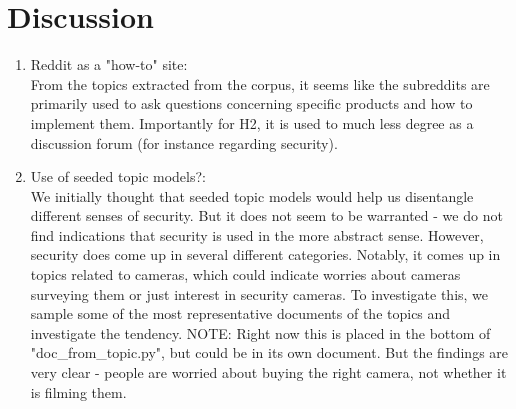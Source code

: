 \documentclass{article}
\begin{document}
    \section{Discussion}
    \begin{enumerate}
        \item Reddit as a "how-to" site:\\
        From the topics extracted from the corpus, it seems like the subreddits are primarily used to ask questions concerning specific products and how to implement them. Importantly for H2, it is used to much less degree as a discussion forum (for instance regarding security).
        \item Use of seeded topic models?:\\
        We initially thought that seeded topic models would help us disentangle different senses of security. But it does not seem to be warranted - we do not find indications that security is used in the more abstract sense. However, security does come up in several different categories. Notably, it comes up in topics related to cameras, which could indicate worries about cameras surveying them or just interest in security cameras. To investigate this, we sample some of the most representative documents of the topics and investigate the tendency. NOTE: Right now this is placed in the bottom of "doc\_from\_topic.py", but could be in its own document. But the findings are very clear - people are worried about buying the right camera, not whether it is filming them. 
    \end{enumerate}
\end{document}
